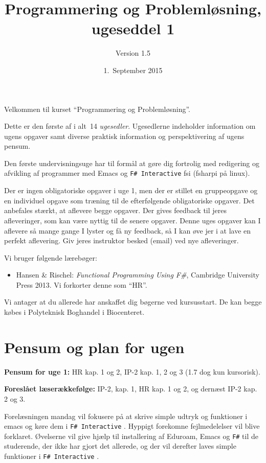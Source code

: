 \documentclass[a4paper,12pt]{article}
\title{Programmering og Problemløsning, ugeseddel 1}
\author{Version 1.5}%
\date{1.\ September 2015}
\newcommand{\fs}{\texttt{F\#} }
\newcommand{\fsi}{\texttt{F\# Interactive} }
\begin{document}
\maketitle{}

Velkommen til kurset ``Programmering og Problemløsning''.

Dette er den første af i alt~14 \emph{ugesedler}. Ugesedlerne
indeholder information om ugens opgaver samt diverse praktisk
information og perspektivering af ugens pensum.

Den første undervisningsuge har til formål at gøre dig fortrolig med
redigering og afvikling af programmer med Emacs og \fsi fsi (fsharpi på linux).

Der er ingen obligatoriske opgaver i uge 1, men der er stillet en
gruppeopgave og en individuel opgave som træning til de efterfølgende obligatoriske opgaver. Det anbefales stærkt, at aflevere begge opgaver. Der gives feedback til jeres afleveringer, som kan være nyttig til de senere opgaver.  Denne uges opgaver kan I aflevere så mange gange I lyster og få ny feedback, så I kan øve jer i at lave en perfekt aflevering.  Giv jeres instruktor besked (email) ved nye afleveringer.

Vi bruger følgende lærebøger:

\begin{itemize}
\item Hansen \& Rischel: \textit{Functional Programming Using F\#},
  Cambridge University Press 2013. Vi forkorter denne som ``HR''.
\end{itemize}

Vi antager at du allerede har anskaffet dig bøgerne ved kursusstart. De kan begge købes i Polyteknisk Boghandel i Biocenteret.


\section{Pensum og plan for ugen}
\label{sec:pensum-og-plan}

\textbf{Pensum for uge 1:} HR kap. 1 og 2, IP-2 kap. 1, 2 og 3 (1.7 dog kun kursorisk).

\textbf{Foreslået læserækkefølge:} IP-2, kap. 1, HR kap. 1 og 2, og dernæst
IP-2 kap. 2 og 3.

Forelæsningen mandag vil fokusere på at skrive simple udtryk og
funktioner i emacs og køre dem i \fsi. Hyppigt forekomne
fejlmedelelser vil blive forklaret. Øvelserne vil give hjælp til
installering af Eduroam, Emacs og \fs til de studerende, der ikke
har gjort det allerede, og der vil derefter laves simple funktioner i
\fsi.
\end{document}

